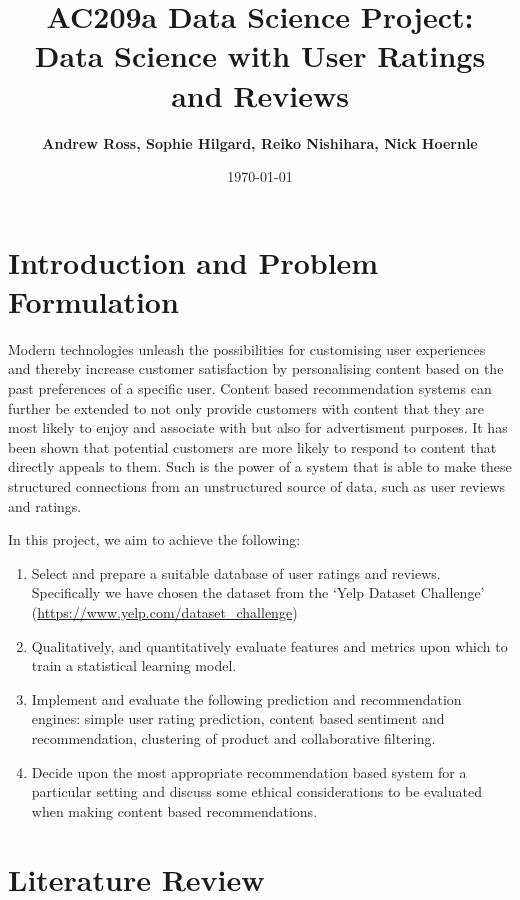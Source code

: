 \documentclass[11pt]{article}
\title{
\vspace{1cm}
\textmd{\textbf{AC209a Data Science Project: Data Science with User Ratings and Reviews}}\\
}
\author{\textbf{Andrew Ross, Sophie Hilgard, Reiko Nishihara, Nick Hoernle}}
\date{\today} %
\begin{document}
\maketitle

\section*{Introduction and Problem Formulation}
	Modern technologies unleash the possibilities for customising user experiences and thereby increase customer satisfaction by personalising content \cite{beginners_guide}
	based on the past preferences of a specific user. Content based recommendation systems can further be extended to not only provide customers with content that they are most likely to enjoy and associate with but also for advertisment purposes. It has been shown \cite{netflix} that potential customers are more likely to respond to content that directly appeals to them. Such is the power of a system that is able to make these structured connections from an unstructured source of data, such as user reviews and ratings.

	In this project, we aim to achieve the following:
	\begin{enumerate}
		\item Select and prepare a suitable database of user ratings and reviews. Specifically we have chosen the dataset from the `Yelp Dataset Challenge' (\url{https://www.yelp.com/dataset_challenge})
		\item Qualitatively, and quantitatively evaluate features and metrics upon which to train a statistical learning model.
		\item Implement and evaluate the following prediction and recommendation engines: simple user rating prediction, content based sentiment and recommendation, clustering of product and collaborative filtering.
		\item Decide upon the most appropriate recommendation based system for a particular setting and discuss some ethical considerations to be evaluated when making content based recommendations.
	\end{enumerate}



\newpage
\section*{Literature Review}
\end{document}
